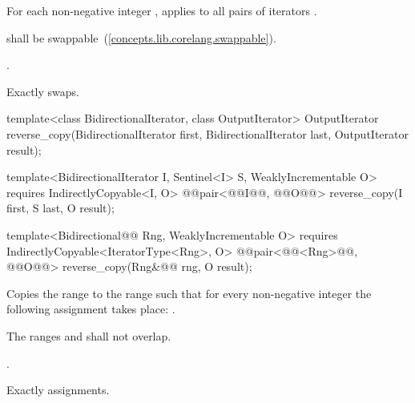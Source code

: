 \begin{itemdescr}
\pnum
\effects
For each non-negative integer
,
applies
to all pairs of iterators
.

\begin{removedblock}
\pnum
\requires
{} shall be swappable~(\ref{concepts.lib.corelang.swappable}).
\end{removedblock}

\begin{addedblock}
\pnum
\returns {}.
\end{addedblock}

\pnum
\complexity
Exactly
swaps.
\end{itemdescr}

%
\begin{removedblock}
\begin{itemdecl}
template<class BidirectionalIterator, class OutputIterator>
  OutputIterator
    reverse_copy(BidirectionalIterator first,
                 BidirectionalIterator last, OutputIterator result);
\end{itemdecl}
\end{removedblock}
\begin{addedblock}
\begin{itemdecl}
template<BidirectionalIterator I, Sentinel<I> S, WeaklyIncrementable O>
  requires IndirectlyCopyable<I, O>
  @@pair<@@I@\newtxt{)}@, @@O@\newtxt{)}@> reverse_copy(I first, S last, O result);

template<Bidirectional@@ Rng, WeaklyIncrementable O>
  requires IndirectlyCopyable<IteratorType<Rng>, O>
  @@pair<@@<Rng>@\newtxt{)}@, @@O@\newtxt{)}@>
    reverse_copy(Rng&@\newtxt{\&}@ rng, O result);
\end{itemdecl}
\end{addedblock}

\begin{itemdescr}
\pnum
\effects
Copies the range
to the range
such that
for every non-negative integer
the following assignment takes place:
.

\pnum
\requires
The ranges
and
shall not overlap.

\pnum
\returns
{}.

\pnum
\complexity
Exactly
assignments.
\end{itemdescr}

